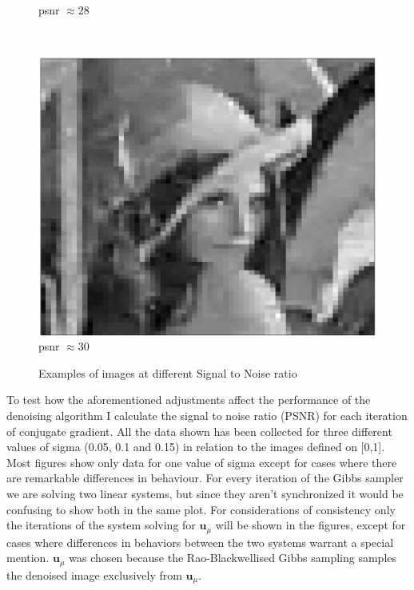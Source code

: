 \documentclass{article}
\begin{document}
\begin{figure}[h]
{\begin{minipage}[b]{0.25\textwidth}
				\small{psnr $\approx 28$}
				\label{psnr_28}
		\end{minipage}%
		~ %
		\begin{minipage}[b]{0.25\textwidth}
                \centering
				\includegraphics[width=\textwidth]{img/img_30_psnr}
				\small{psnr $\approx 30$}
				\label{psnr_30}
		\end{minipage}%
	}%
		\caption{Examples of images at different Signal to Noise ratio}
		\label{img_examples}
\end{figure}

To test how the aforementioned adjustments affect the performance of the 
denoising algorithm I calculate the signal to noise ratio (PSNR) for 
each iteration of conjugate gradient. All the data shown has been 
collected for three different values of sigma (0.05, 0.1 and 0.15) in 
relation to the images defined on [0,1]. Most figures show only data for 
one value of sigma except for cases where there are remarkable 
differences in behaviour. For every iteration of the Gibbs sampler we 
are solving two linear systems, but since they aren't synchronized it 
would be confusing to show both in the same plot. For considerations of 
consistency only the iterations of the system solving for 
$\textbf{u}_{\mu}$ will be shown in the figures, except for cases where 
differences in behaviors between the two systems warrant a special 
mention. $\textbf{u}_{\mu}$ was chosen because the Rao-Blackwellised 
Gibbs sampling samples the denoised image exclusively from 
$\textbf{u}_{\mu}$.
\end{document}
